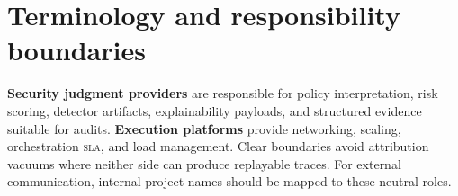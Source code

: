 \documentclass[11pt,a4paper]{report}
\begin{document}
\appendix

\chapter{Terminology and responsibility boundaries}
\textbf{Security judgment providers} are responsible for policy interpretation, risk scoring, detector artifacts, explainability payloads, and structured evidence suitable for audits. \textbf{Execution platforms} provide networking, scaling, orchestration \textsc{sla}, and load management. Clear boundaries avoid attribution vacuums where neither side can produce replayable traces. For external communication, internal project names should be mapped to these neutral roles.
\end{document}
